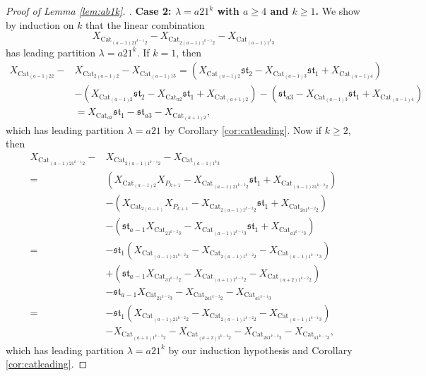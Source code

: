 \documentclass[12pt]{amsart}  %
\theoremstyle{definition}
\theoremstyle{remark}
\numberwithin{equation}{section}
\begin{document}
\begin{proof}[Proof of Lemma \ref{lem:ab1k}. ]
\textbf{Case 2: $\lambda=a21^k$ with $a\geq 4$ and $k\geq 1$. } We show by induction on $k$ that the linear combination
\begin{equation*}
X_{\text{Cat}_{(a-1)21^{k-1}2}}-X_{\text{Cat}_{2(a-1)1^{k-1}2}}-X_{\text{Cat}_{(a-1)1^k3}}\end{equation*}
has leading partition $\lambda=a21^k$. If $k=1$, then 
\begin{align*}
X_{\text{Cat}_{(a-1)22}}-&X_{\text{Cat}_{2(a-1)2}}-X_{\text{Cat}_{(a-1)13}}=(X_{\text{Cat}_{(a-1)2}}\mathfrak{st}_2-X_{\text{Cat}_{(a-1)3}}\mathfrak{st}_1+X_{\text{Cat}_{(a-1)4}})\\&-(X_{\text{Cat}_{(a-1)2}}\mathfrak{st}_2-X_{\text{Cat}_{a2}}\mathfrak{st}_1+X_{\text{Cat}_{(a+1)2}})-(\mathfrak{st}_{a3}-X_{\text{Cat}_{(a-1)3}}\mathfrak{st}_1+X_{\text{Cat}_{(a-1)4}})\\&=X_{\text{Cat}_{a2}}\mathfrak{st}_1-\mathfrak{st}_{a3}-X_{\text{Cat}_{(a+1)2}},
\end{align*}
which has leading partition $\lambda=a21$ by Corollary \ref{cor:catleading}. Now if $k\geq 2$, then
\begin{align*}
X_{\text{Cat}_{(a-1)21^{k-1}2}}-&X_{\text{Cat}_{2(a-1)1^{k-1}2}}-X_{\text{Cat}_{(a-1)1^k3}}\\=&(X_{\text{Cat}_{(a-1)2}}X_{P_{k+1}}-X_{\text{Cat}_{(a-1)21^{k-2}2}}\mathfrak{st}_1+X_{\text{Cat}_{(a-1)31^{k-2}2}})\\
&-(X_{\text{Cat}_{2(a-1)}}X_{P_{k+1}}-X_{\text{Cat}_{2(a-1)1^{k-2}2}}\mathfrak{st}_1+X_{\text{Cat}_{2a1^{k-2}2}})\\&-(\mathfrak{st}_{a-1}X_{\text{Cat}_{21^{k-2}3}}-X_{\text{Cat}_{(a-1)1^{k-1}3}}\mathfrak{st}_1+X_{\text{Cat}_{a1^{k-1}3}})\\=&-\mathfrak{st}_1(X_{\text{Cat}_{(a-1)21^{k-2}2}}-X_{\text{Cat}_{2(a-1)1^{k-2}2}}-X_{\text{Cat}_{(a-1)1^{k-1}3}})\\&+(\mathfrak{st}_{a-1}X_{\text{Cat}_{31^{k-2}2}}-X_{\text{Cat}_{(a+1)1^{k-2}2}}-X_{\text{Cat}_{(a+2)1^{k-2}2}})\\&-\mathfrak{st}_{a-1}X_{\text{Cat}_{21^{k-2}3}}-X_{\text{Cat}_{2a1^{k-2}2}}-X_{\text{Cat}_{a1^{k-1}3}}\\=&-\mathfrak{st}_1(X_{\text{Cat}_{(a-1)21^{k-2}2}}-X_{\text{Cat}_{2(a-1)1^{k-2}2}}-X_{\text{Cat}_{(a-1)1^{k-1}3}})\\&-X_{\text{Cat}_{(a+1)1^{k-2}2}}-X_{\text{Cat}_{(a+2)1^{k-2}2}}-X_{\text{Cat}_{2a1^{k-2}2}}-X_{\text{Cat}_{a1^{k-1}3}},
\end{align*}
which has leading partition $\lambda=a21^k$ by our induction hypothesis and Corollary \ref{cor:catleading}. 


\end{proof}
\end{document}

